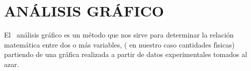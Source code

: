 %
\section{AN\'{A}LISIS GR\'{A}FICO}

El \ an\'{a}lisis gr\'{a}fico es un m\'{e}todo que nos sirve para determinar
la relaci\'{o}n matem\'{a}tica entre dos o m\'{a}s variables, ( en nuestro
caso cantidades f\'{\i}sicas) partiendo de una gr\'{a}fica realizada a partir
de datos experimentales tomados al azar.

